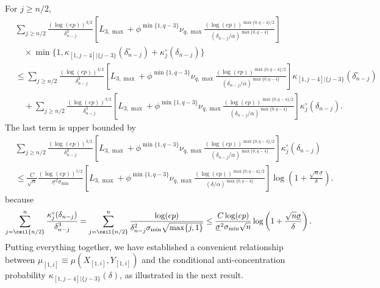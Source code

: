 \documentclass[aos]{imsart}
\begin{document}
\medskip
For $j \geq n/2$,
\begin{equation*}
\begin{aligned}
    & \sum_{j \geq n/2} \frac{(\log(ep))^{3/2}}{\delta_{n-j}^3} \left[ 
        {L}_{3,\max} 
        + \phi^{\min\{1, q-3\}} \nu_{q,\max} \frac{ {(\log(ep))}^{\max\{0, q-4\}/2}}{(\delta_{n-j}/\alpha)^{\max\{0, q-4\}}}
    \right] \\
    & \quad \times \min\{ 1, \kappa_{[1,j-4]|\{j-3\}}(\delta_{n-j}^\circ) + \kappa^\circ_{j}(\delta_{n-j}) \} \\
    & \leq \sum_{j \geq n/2} \frac{(\log(ep))^{3/2}}{\delta_{n-j}^3} \left[ 
        {L}_{3,\max} 
        + \phi^{\min\{1, q-3\}} \nu_{q,\max} \frac{ {(\log(ep))}^{\max\{0, q-4\}/2}}{(\delta_{n-j}/\alpha)^{\max\{0, q-4\}}}
    \right]
    \kappa_{[1,j-4]|\{j-3\}}(\delta_{n-j}^\circ) \\
    & \quad + \sum_{j \geq n/2} \frac{(\log(ep))^{3/2}}{\delta_{n-j}^3} \left[ 
        {L}_{3,\max} 
        + \phi^{\min\{1, q-3\}} \nu_{q,\max} \frac{ {(\log(ep))}^{\max\{0, q-4\}/2}}{(\delta_{n-j}/\alpha)^{\max\{0, q-4\}}}
    \right]
    \kappa^\circ_{j}(\delta_{n-j}).
\end{aligned}
\end{equation*}
The last term is upper bounded by
\begin{equation*}
\begin{aligned}
    & \sum_{j \geq n/2} \frac{(\log(ep))^{3/2}}{\delta_{n-j}^3} \left[ 
        {L}_{3,\max} 
        + \phi^{\min\{1, q-3\}} \nu_{q,\max} \frac{ {(\log(ep))}^{\max\{0, q-4\}/2}}{(\delta_{n-j}/\alpha)^{\max\{0, q-4\}}}
    \right] \kappa^\circ_{j}(\delta_{n-j}) \\
    & \leq \frac{C}{\sqrt{n}} \frac{(\log(ep))^{5/2}}{\underline{\sigma}^2\sigma_{\min}}
    \left[ 
        {L}_{3,\max} + \phi^{\min\{1, q-3\}} \nu_{q,\max} \frac{ {(\log(ep))}^{\max\{0, q-4\}/2}}{(\delta/\alpha)^{\max\{0, q-4\}}}
    \right]
    \log\left(1 + \frac{\sqrt{n}\underline{\sigma}}{\delta}\right).
\end{aligned}
\end{equation*}
because
\begin{equation} \label{eq:sum_delta_3_kappa}
    \sum_{j=\ceil{n/2}}^{n} \frac{\kappa^\circ_{j}(\delta_{n-j})}{\delta_{n-j}^3}
    = \sum_{j=\ceil{n/2}}^{n} \frac{\log(ep)}{\delta_{n-j}^2 \sigma_{\min} \sqrt{\max\{j,1\}}}
    \leq \frac{C\log(ep)}{\underline{\sigma}^2\sigma_{\min}\sqrt{n}}
    \log\left(1 + \frac{\sqrt{n}\underline{\sigma}}{\delta}\right).
\end{equation}
Putting everything together, we have established a convenient relationship between $\mu_{[1,i]} \equiv \mu(X_{[1,i]}, Y_{[1,i]})$ and the conditional anti-concentration probability $\kappa_{[1,j-4]|\{j-3\}}(\delta)$, as illustrated in the next result.
\end{document}
